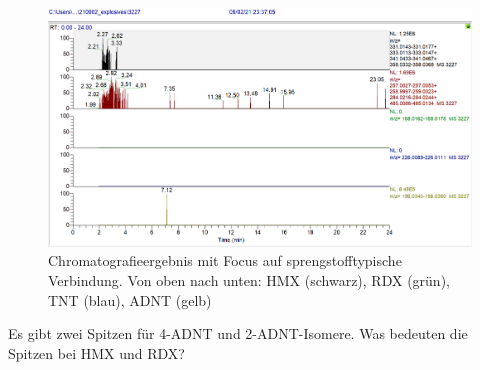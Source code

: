 \begin{figure}[htb]
\includegraphics[height=\textheight,%
                   width=\textwidth,%
                   keepaspectratio]{Bilder/Explosives_3227_SampleW1.PNG}
\caption{Chromatografieergebnis mit Focus auf sprengstofftypische Verbindung. Von oben nach unten: HMX (schwarz), RDX (grün), TNT (blau), ADNT (gelb)}
\end{figure}
Es gibt zwei Spitzen für 4-ADNT und 2-ADNT-Isomere.
Was bedeuten die Spitzen bei HMX und RDX?

